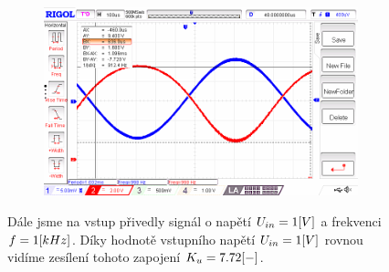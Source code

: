 \documentclass{article}
\begin{document}
\begin{figure}[H]
	\begin{minipage}[t]{0.6\textwidth}
    \vspace{-20mm}
    \begin{figure}[H]
      \includegraphics[width=\textwidth]{LAB/NewFile2.png}
      \caption{\label{obvod_z_laborky}}
    \end{figure}
  \end{minipage}
  \hfill
	\begin{minipage}[t]{0.35\textwidth}
    Dále jsme na vstup přivedly signál o napětí \(U_{in} = 1\-[V]\) a frekvenci \(f = 1\-[kHz]\). 
    Díky hodnotě vstupního napětí \(U_{in} = 1\-[V]\) rovnou vidíme zesílení tohoto zapojení \(K_u = 7.72\-[-]\).
  \end{minipage}
\end{figure}
\end{document}
